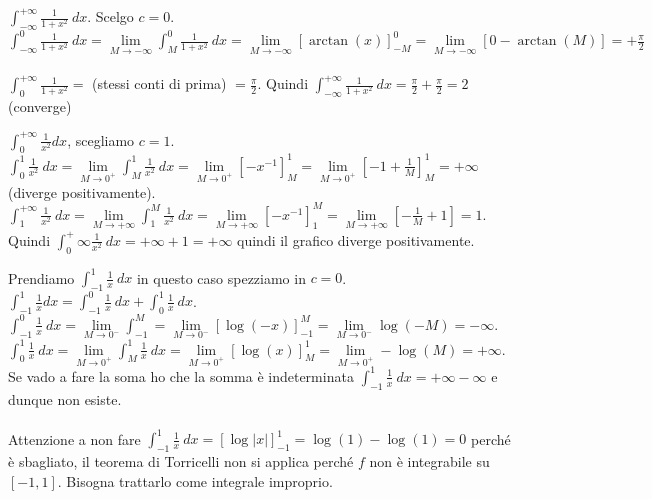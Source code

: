\begin{example}
$\int_{-\infty}^{+\infty} \frac{1}{1+x^2}\:dx$. Scelgo $c=0$.\\
$\int_{-\infty}^0 \frac{1}{1+x^2}\:dx = \lim\limits_{M\to -\infty} \int_M^0\frac{1}{1+x^2}\:dx = \lim\limits_{M\to -\infty} [\arctan(x)]_{-M}^0 = \lim\limits_{M\to -\infty}[0 -\arctan(M)] = +\frac{\pi}{2}$\\\\
$\int_0^{+\infty}\frac{1}{1+x^2}=$ (stessi conti di prima) $= \frac{\pi}{2}$.
Quindi $\int_{-\infty}^{+\infty}\frac{1}{1+x^2}\:dx = \frac{\pi}{2}+\frac{\pi}{2} = 2$ (converge)
\end{example}

\begin{example}
$\int_0^{+\infty}\frac{1}{x^2}dx$, scegliamo $c=1$.\\
$\int_0^1 \frac{1}{x^2}\:dx = \lim\limits_{M\to 0^+} \int_M^1\frac{1}{x^2}\:dx = \lim\limits_{M\to 0^+}[-x^{-1}]_M^1 = \lim\limits_{M\to 0^+}[-1+\frac{1}{M}]_M^1 = +\infty$ (diverge positivamente).\\
$\int_1^{+\infty}\frac{1}{x^2}\:dx = \lim\limits_{M\to +\infty}\int_1^M \frac{1}{x^2}\:dx = \lim\limits_{M\to +\infty}[-x^{-1}]_1^M = \lim\limits_{M\to +\infty}[-\frac{1}{M} + 1] = 1$.\\
Quindi $\int_0^+\infty \frac{1}{x^2}\:dx = +\infty + 1 = +\infty$ quindi il grafico diverge positivamente.
\end{example}

\begin{example}
Prendiamo $\int_{-1}^1 \frac{1}{x}\:dx$ in questo caso spezziamo in $c=0$.\\
$\int_{-1}^1 \frac{1}{x}dx = \int_{-1}^0 \frac{1}{x}\:dx + \int_0^1\frac{1}{x}\:dx$.\\
$\int_{-1}^0 \frac{1}{x}\:dx = \lim\limits_{M\to 0^-}\int_{-1}^M =  \lim\limits_{M\to 0^-} [\log(-x)]_{-1}^M =  \lim\limits_{M\to 0^-} \log(-M) = -\infty$.\\
$\int_0^1\frac{1}{x}\:dx = \lim\limits_{M\to 0^+}\int_M^1\frac{1}{x}\:dx = \lim\limits_{M\to 0^+} [\log(x)]_M^1 = \lim\limits_{M\to 0^+} -\log(M) = +\infty$.\\
Se vado a fare la soma ho che la somma è indeterminata $\int_{-1}^1 \frac{1}{x}\:dx = +\infty - \infty$ e dunque non esiste.\\\\
Attenzione a non fare $\int_{-1}^1 \frac{1}{x}\:dx = [\log|x|]_{-1}^1 = \log(1) - \log(1) = 0$ perché è sbagliato, il teorema di Torricelli non si applica perché $f$ non è integrabile su $[-1,1]$. Bisogna trattarlo come integrale improprio. 
\end{example}

